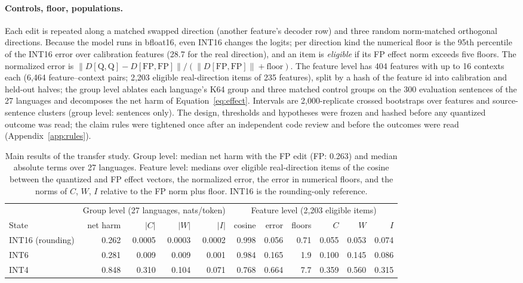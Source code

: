 \paragraph{Controls, floor, populations.}
Each edit is repeated along a matched swapped direction (another feature's decoder row) and three random norm-matched orthogonal directions. Because the model runs in bfloat16, even INT16 changes the logits; per direction kind the numerical floor is the 95th percentile of the INT16 error over calibration features (28.7 for the real direction), and an item is \emph{eligible} if its FP effect norm exceeds five floors. The normalized error is $\lVert D[\mathrm{Q},\mathrm{Q}]-D[\mathrm{FP},\mathrm{FP}]\rVert/(\lVert D[\mathrm{FP},\mathrm{FP}]\rVert+\text{floor})$. The feature level has 404 features with up to 16 contexts each (6,464 feature--context pairs; 2,203 eligible real-direction items of 235 features), split by a hash of the feature id into calibration and held-out halves; the group level ablates each language's K64 group and three matched control groups on the 300 evaluation sentences of the 27 languages and decomposes the net harm of Equation~\ref{eq:effect}. Intervals are 2,000-replicate crossed bootstraps over features and source-sentence clusters (group level: sentences only). The design, thresholds and hypotheses were frozen and hashed before any quantized outcome was read; the claim rules were tightened once after an independent code review and before the outcomes were read (Appendix~\ref{app:rules}).

\begin{table}[t]
\centering\small
\begin{tabular}{lrrrrrrrrrr}
\toprule
 & \multicolumn{4}{c}{Group level (27 languages, nats/token)} & \multicolumn{6}{c}{Feature level (2,203 eligible items)}\\
\cmidrule(lr){2-5}\cmidrule(lr){6-11}
State & net harm & $|C|$ & $|W|$ & $|I|$ & cosine & error & floors & $C$ & $W$ & $I$\\
\midrule
INT16 (rounding) & 0.262 & 0.0005 & 0.0003 & 0.0002 & 0.998 & 0.056 & 0.71 & 0.055 & 0.053 & 0.074\\
INT6 & 0.281 & 0.009 & 0.009 & 0.001 & 0.984 & 0.165 & 1.9 & 0.100 & 0.145 & 0.086\\
INT4 & 0.848 & 0.310 & 0.104 & 0.071 & 0.768 & 0.664 & 7.7 & 0.359 & 0.560 & 0.315\\
\bottomrule
\end{tabular}
\caption{Main results of the transfer study. Group level: median net harm with the FP edit (FP: 0.263) and median absolute terms over 27 languages. Feature level: medians over eligible real-direction items of the cosine between the quantized and FP effect vectors, the normalized error, the error in numerical floors, and the norms of $C$, $W$, $I$ relative to the FP norm plus floor. INT16 is the rounding-only reference.}
\label{tab:transfer}
\end{table}

